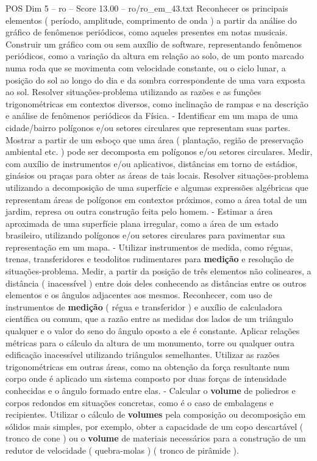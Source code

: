 \begin{textsample}{POS Dim 5 – ro – Score 13.00 – ro/ro\_em\_43.txt}
Reconhecer os principais elementos ( período, amplitude, comprimento de onda ) a partir da análise do gráfico de fenômenos periódicos, como aqueles presentes em notas musicais.
Construir um gráfico com ou sem auxílio de software, representando fenômenos periódicos, como a variação da altura em relação ao solo, de um ponto marcado numa roda que se movimenta com velocidade constante, ou o ciclo lunar, a posição do sol ao longo do dia e da sombra correspondente de uma vara exposta ao sol.
Resolver situações-problema utilizando as razões e as funções trigonométricas em contextos diversos, como inclinação de rampas e na descrição e análise de fenômenos periódicos da Física. - Identificar em um mapa de uma cidade/bairro polígonos e/ou setores circulares que representam suas partes.
Mostrar a partir de um esboço que uma área ( plantação, região de preservação ambiental etc. ) pode ser decomposta em polígonos e/ou setores circulares.
Medir, com auxílio de instrumentos e/ou aplicativos, distâncias em torno de estádios, ginásios ou praças para obter as áreas de tais locais.
Resolver situações-problema utilizando a decomposição de uma superfície e algumas expressões algébricas que representam áreas de polígonos em contextos próximos, como a área total de um jardim, represa ou outra construção feita pelo homem. - Estimar a área aproximada de uma superfície plana irregular, como a área de um estado brasileiro, utilizando polígonos e/ou setores circulares para pavimentar sua representação em um mapa. - Utilizar instrumentos de medida, como réguas, trenas, transferidores e teodolitos rudimentares para \textbf{medição} e resolução de situações-problema.
Medir, a partir da posição de três elementos não colineares, a distância ( inacessível ) entre dois deles conhecendo as distâncias entre os outros elementos e os ângulos adjacentes aos mesmos.
Reconhecer, com uso de instrumentos de \textbf{medição} ( régua e transferidor ) e auxílio de calculadora científica ou comum, que a razão entre as medidas dos lados de um triângulo qualquer e o valor do seno do ângulo oposto a ele é constante.
Aplicar relações métricas para o cálculo da altura de um monumento, torre ou qualquer outra edificação inacessível utilizando triângulos semelhantes.
Utilizar as razões trigonométricas em outras áreas, como na obtenção da força resultante num corpo onde é aplicado um sistema composto por duas forças de intensidade conhecidas e o ângulo formado entre elas. - Calcular o \textbf{volume} de poliedros e corpos redondos em situações concretas, como é o caso de embalagens e recipientes.
Utilizar o cálculo de \textbf{volumes} pela composição ou decomposição em sólidos mais simples, por exemplo, obter a capacidade de um copo descartável ( tronco de cone ) ou o \textbf{volume} de materiais necessários para a construção de um redutor de velocidade ( quebra-molas ) ( tronco de pirâmide ).

\end{textsample}
